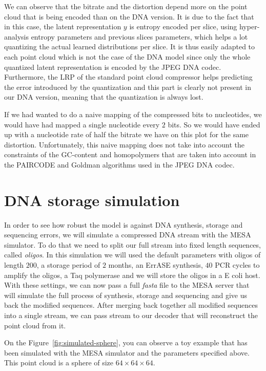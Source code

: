 We can observe that the bitrate and the distortion depend more on the point cloud that is being encoded than on the DNA version. It is due to the fact that in this case, the latent representation $y$ is entropy encoded per slice, using hyper-analysis entropy parameters and previous slices parameters, which helps a lot quantizing the actual learned distributions per slice. It is thus easily adapted to each point cloud which is not the case of the DNA model since only the whole quantized latent representation is encoded by the JPEG DNA codec. 
Furthermore, the LRP of the standard point cloud compressor helps predicting the error introduced by the quantization and this part is clearly not present in our DNA version, meaning that the quantization is always lost.

If we had wanted to do a naive mapping of the compressed bits to nucleotides, we would have had mapped a single nucleotide every $2$ bits. So we would have ended up with a nucleotide rate of half the bitrate we have on this plot for the same distortion. 
Unfortunately, this naive mapping does not take into account the constraints of the GC-content and homopolymers that are taken into account in the PAIRCODE and Goldman algorithms used in the JPEG DNA codec.

\section{DNA storage simulation}
\label{sec:simu}

In order to see how robust the model is against DNA synthesis, storage and sequencing errors, we will simulate a compressed DNA stream with the MESA simulator. To do that we need to split our full stream into fixed length sequences, called \textit{oligos}. In this simulation we will used the default parameters with oligos of length $200$, a storage period of $2$ months, an ErrASE synthesis, $40$ PCR cycles to amplify the oligos, a Taq polymerase and we will store the oligos in a E coli host. With these settings, we can now pass a full \textit{fasta} file to the MESA server that will simulate the full process of synthesis, storage and sequencing and give us back the modified sequences. After merging back together all modified sequences into a single stream, we can pass stream to our decoder that will reconstruct the point cloud from it. 

On the Figure~\ref{fig:simulated-sphere}, you can observe a toy example that has been simulated with the MESA simulator and the parameters specified above. This point cloud is a sphere of size $64 \times 64 \times 64$.

